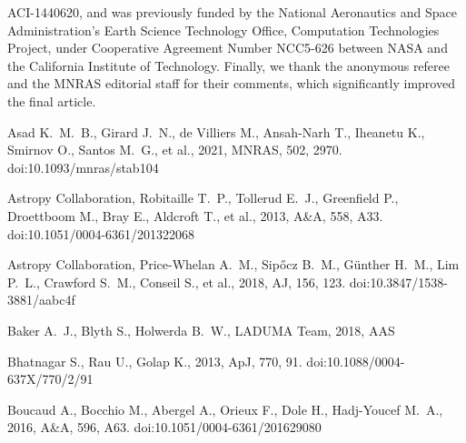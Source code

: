 \documentclass[usenatbib,usedcolumn]{mnras}
\begin{document}
ACI-1440620, and was previously funded by the National Aeronautics and Space Administration's Earth Science Technology Office, Computation Technologies Project, under Cooperative Agreement Number NCC5-626 between NASA and the California Institute of Technology. Finally, we thank the anonymous referee and the MNRAS editorial staff for their comments, which significantly improved the final article.




%

\begin{thebibliography}{}


 Asad K.~M.~B., Girard J.~N., de Villiers M., Ansah-Narh T., Iheanetu K., Smirnov O., Santos M.~G., et al., 2021, MNRAS, 502, 2970. doi:10.1093/mnras/stab104

 Astropy Collaboration, Robitaille T.~P., Tollerud E.~J., Greenfield P., Droettboom M., Bray E., Aldcroft T., et al., 2013, A\&A, 558, A33. doi:10.1051/0004-6361/201322068

 Astropy Collaboration, Price-Whelan A.~M., Sip{\H{o}}cz B.~M., G{\"u}nther H.~M., Lim P.~L., Crawford S.~M., Conseil S., et al., 2018, AJ, 156, 123. doi:10.3847/1538-3881/aabc4f

 Baker A.~J., Blyth S., Holwerda B.~W., LADUMA Team, 2018, AAS

 Bhatnagar S., Rau U., Golap K., 2013, ApJ, 770, 91. doi:10.1088/0004-637X/770/2/91


 Boucaud A., Bocchio M., Abergel A., Orieux F., Dole H., Hadj-Youcef M.~A., 2016, A\&A, 596, A63. doi:10.1051/0004-6361/201629080


\end{thebibliography}
\end{document}
